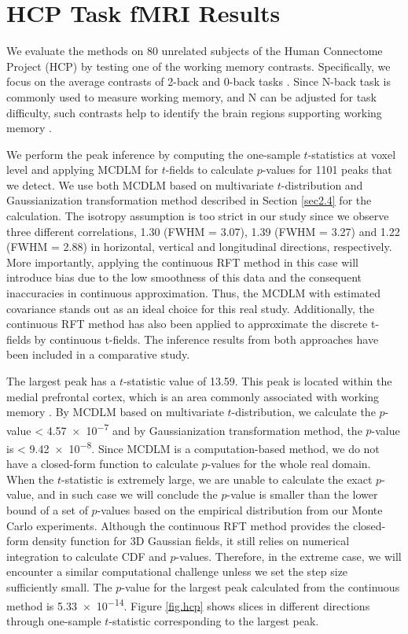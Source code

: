 \documentclass{article}
\begin{document}
\section{HCP Task fMRI Results}
\label{sec5}
We evaluate the methods on 80 unrelated subjects of the Human Connectome Project (HCP) by testing one of the working memory contrasts. Specifically, we focus on the average contrasts of 2-back and 0-back tasks \citep{davenport2020selective}. Since N-back task is commonly used to measure working memory, and N can be adjusted for task difficulty, such contrasts help to identify the brain regions supporting working memory \citep{kirchner1958age}.   

We perform the peak inference by computing the one-sample $t$-statistics at voxel level and applying MCDLM for $t$-fields to calculate $p$-values for 1101 peaks that we detect. We use both MCDLM based on multivariate $t$-distribution and Gaussianization transformation method described in Section \ref{sec2.4} for the calculation. The isotropy assumption is too strict in our study since we observe three different correlations, 1.30 (FWHM = 3.07), 1.39 (FWHM = 3.27) and 1.22 (FWHM = 2.88) in horizontal, vertical and longitudinal directions, respectively. More importantly, applying the continuous RFT method in this case will introduce bias due to the low smoothness of this data and the consequent inaccuracies in continuous approximation.  Thus, the MCDLM with estimated covariance stands out as an ideal choice for this real study. Additionally, the continuous RFT method has also been applied to approximate the discrete t-fields by continuous t-fields. The inference results from both approaches have been included in a comparative study. 

The largest peak has a $t$-statistic value of 13.59. This peak is located within the medial prefrontal cortex, which is an area commonly associated with working memory \citep{euston2012role,perlstein2002dissociation}. By MCDLM based on multivariate $t$-distribution, we calculate the $p$-value < \num{4.57e-7} and by Gaussianization transformation method, the $p$-value is < \num{9.42e-8}. Since MCDLM is a computation-based method, we do not have a closed-form function to calculate $p$-values for the whole real domain. When the $t$-statistic is extremely large, we are unable to calculate the exact $p$-value, and in such case we will conclude the $p$-value is smaller than the lower bound of a set of $p$-values based on the empirical distribution from our Monte Carlo experiments. Although the continuous RFT method provides the closed-form density function for 3D Gaussian fields, it still relies on numerical integration to calculate CDF and $p$-values. Therefore, in the extreme case, we will encounter a similar computational challenge unless we set the step size sufficiently small. The $p$-value for the largest peak calculated from the continuous method is \num{5.33e-14}. Figure \ref{fig.hcp} shows slices in different directions through one-sample $t$-statistic corresponding to the largest peak. 
\end{document}
